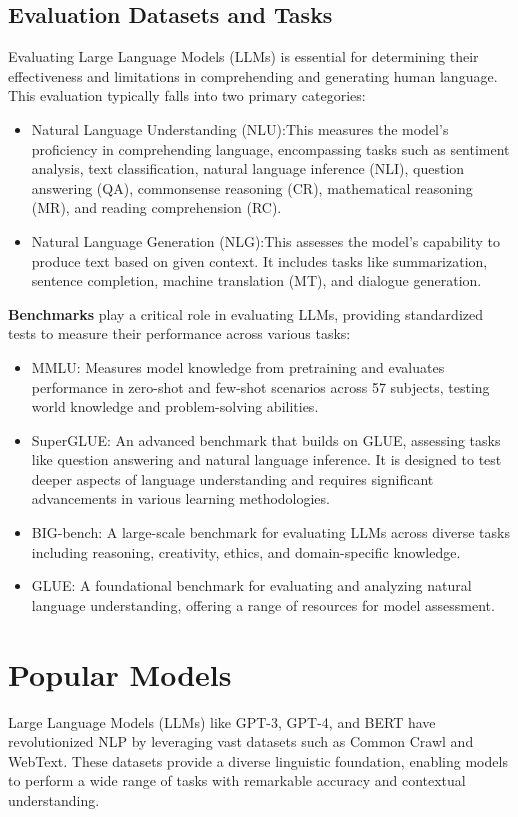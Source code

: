\subsection{Evaluation Datasets and Tasks}
Evaluating Large Language Models (LLMs) is essential for determining their effectiveness and limitations in comprehending and generating human language. This evaluation typically falls into two primary categories:
\begin{itemize}
	\item Natural Language Understanding (NLU):This measures the model's proficiency in comprehending language, encompassing tasks such as sentiment analysis, text classification, natural language inference (NLI), question answering (QA), commonsense reasoning (CR), mathematical reasoning (MR), and reading comprehension (RC).
	\item Natural Language Generation (NLG):This assesses the model's capability to produce text based on given context. It includes tasks like summarization, sentence completion, machine translation (MT), and dialogue generation.
\end{itemize}
\textbf{Benchmarks} play a critical role in evaluating LLMs, providing standardized tests to measure their performance across various tasks:
\begin{itemize}
	\item MMLU: Measures model knowledge from pretraining and evaluates performance in zero-shot and few-shot scenarios across 57 subjects, testing world knowledge and problem-solving abilities.
	\item SuperGLUE: An advanced benchmark that builds on GLUE, assessing tasks like question answering and natural language inference. It is designed to test deeper aspects of language understanding and requires significant advancements in various learning methodologies.
	\item BIG-bench: A large-scale benchmark for evaluating LLMs across diverse tasks including reasoning, creativity, ethics, and domain-specific knowledge.
	\item GLUE: A foundational benchmark for evaluating and analyzing natural language understanding, offering a range of resources for model assessment\cite{Naveed2024}.
\end{itemize}
\section{Popular Models}
Large Language Models (LLMs) like GPT-3, GPT-4, and BERT have revolutionized NLP by leveraging vast datasets such as Common Crawl and WebText. These datasets provide a diverse linguistic foundation, enabling models to perform a wide range of tasks with remarkable accuracy and contextual understanding.
